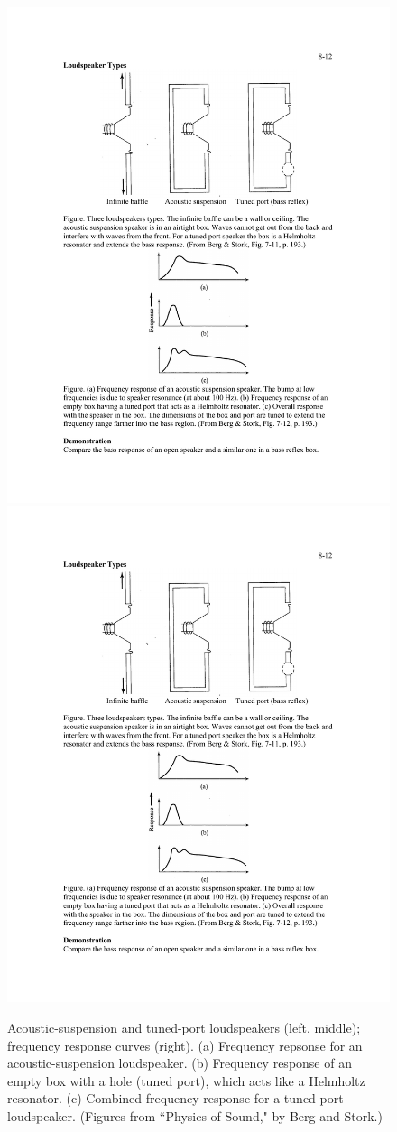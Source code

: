 %
%
\begin{figure}[htbp]
\begin{center}
\includegraphics[height=0.4\textwidth]{loudspeaker_tunedport}
\hspace{0.2in}
\includegraphics[height=0.4\textwidth]{loudspeaker_tunedport_response}
\caption{Acoustic-suspension and tuned-port loudspeakers (left, middle); 
frequency response curves (right).
(a) Frequency repsonse for an acoustic-suspension loudspeaker.
(b) Frequency response of an empty box with a hole (tuned port), 
which acts like a Helmholtz resonator.
(c) Combined frequency response for a tuned-port loudspeaker.
(Figures from ``Physics of Sound," by Berg and Stork.)} 
\label{f:loudspeaker_tunedport}
\end{center}
\end{figure}
%

